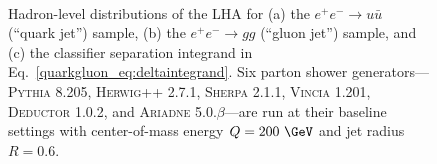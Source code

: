\documentclass[11pt]{cernrep}
\begin{document}
\begin{figure}
\centering
{}
$\qquad$

\caption{Hadron-level distributions of the LHA for (a) the $e^+ e^- \to u \bar{u}$ (``quark jet'') sample, (b) the $e^+ e^- \to gg$ (``gluon jet'') sample, and (c) the classifier separation integrand in Eq.~\eqref{quarkgluon_eq:deltaintegrand}.  Six parton shower generators---\textsc{Pythia 8.205}, \textsc{Herwig++ 2.7.1}, \textsc{Sherpa 2.1.1}, \textsc{Vincia 1.201}, \textsc{Deductor 1.0.2}, and \textsc{Ariadne 5.0.$\beta$}---are run at their baseline settings with center-of-mass energy $Q = 200~\GeV$ and jet radius $R= 0.6$.}
\label{quarkgluon_fig:LHA_hadron}
\end{figure}
\end{document}
